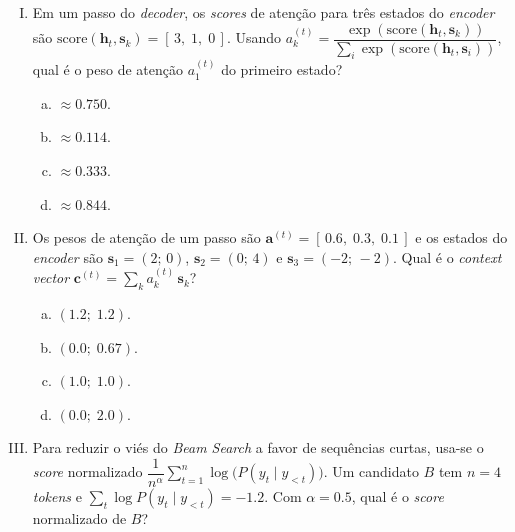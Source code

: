 \documentclass{dlproblemset}
\begin{document}
\begin{enumerate}[I)]
\item Em um passo do \textit{decoder}, os \textit{scores} de atenção para três estados do
\textit{encoder} são $\text{score}(\mathbf{h}_t, \mathbf{s}_k) = [\,3,\; 1,\; 0\,]$. Usando
$a_k^{(t)} = \dfrac{\exp(\text{score}(\mathbf{h}_t, \mathbf{s}_k))}{\sum_i \exp(\text{score}(\mathbf{h}_t, \mathbf{s}_i))}$, qual é o
peso de atenção $a_1^{(t)}$ do primeiro estado?

\begin{enumerate}[a)]
    \item $\approx 0.750$.
    \item $\approx 0.114$.
    \item $\approx 0.333$.
    \item $\approx 0.844$.
\end{enumerate}

\item Os pesos de atenção de um passo são $\mathbf{a}^{(t)} = [\,0.6,\; 0.3,\; 0.1\,]$ e os estados do
\textit{encoder} são $\mathbf{s}_1 = (2;\, 0)$, $\mathbf{s}_2 = (0;\, 4)$ e $\mathbf{s}_3 = ({-}2;\, {-}2)$. Qual é o
\textit{context vector} $\mathbf{c}^{(t)} = \sum_k a_k^{(t)}\, \mathbf{s}_k$?

\begin{enumerate}[a)]
    \item $(1.2;\; 1.2)$.
    \item $(0.0;\; 0.67)$.
    \item $(1.0;\; 1.0)$.
    \item $(0.0;\; 2.0)$.
\end{enumerate}

\item {} Para reduzir o viés do \textit{Beam Search} a favor de
sequências curtas, usa-se o \textit{score} normalizado
$\dfrac{1}{n^{\alpha}} \sum_{t=1}^{n} \log\bigl(P(y_t \mid y_{<t})\bigr)$. Um candidato $B$ tem
$n = 4$ \textit{tokens} e $\sum_{t} \log P(y_t \mid y_{<t}) = -1.2$. Com $\alpha = 0.5$, qual é o
\textit{score} normalizado de $B$?


\end{enumerate}
\end{document}
